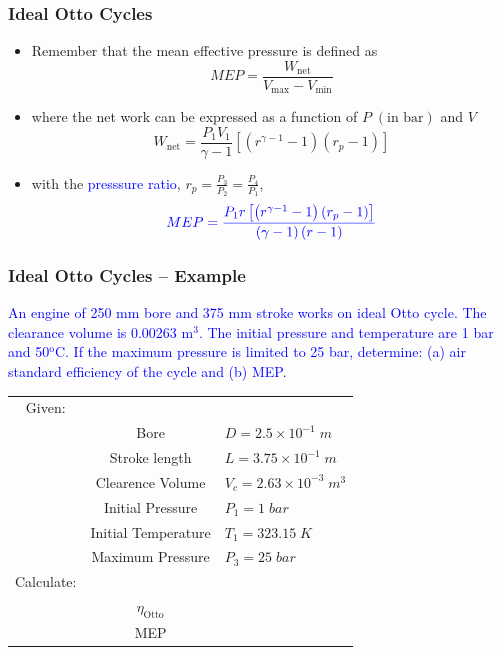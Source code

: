 \documentclass[10pt,compress]{beamer}
\begin{document}
\begin{frame}
 \frametitle{Ideal Otto Cycles}
 \begin{itemize}
  \item <1-> Remember that the mean effective pressure is defined as
   \begin{displaymath}
    MEP = \displaystyle\frac{W_{\text{net}}}{V_{\text{max}}-V_{\text{min}}}
   \end{displaymath}
  \item<2-> where the net work can be expressed as a function of $P\;\left(\text{in bar}\right)$ and $V$
   \begin{displaymath}
     W_{\text{net}} = \displaystyle\frac{P_{1}V_{1}}{\gamma - 1}\left[\left(r^{\gamma-1}-1\right)\left(r_{p}-1\right)\right]
   \end{displaymath}
  \item<3-> with the \textcolor{blue}{presssure ratio}, $r_{p}=\displaystyle\frac{P_{3}}{P_{2}}=\displaystyle\frac{P_{4}}{P_{1}}$,
   \begin{displaymath}
    \textcolor{blue}{MEP = \displaystyle\frac{P_{1}r\left[\left(r^{\gamma-1} - 1\right)\left(r_{p}-1\right)\right]} {\left(\gamma-1\right)\left(r-1\right)}}
   \end{displaymath}
   
 \end{itemize}
\end{frame}


\begin{frame}
 \frametitle{Ideal Otto Cycles -- Example}
\textcolor{blue}{An engine of 250 mm bore and 375 mm stroke works on ideal Otto cycle. The clearance volume is 0.00263 m$^{3}$. The initial pressure and temperature are 1 bar and 50$^{\text{o}}$C. If the maximum pressure is limited to 25 bar, determine: (a) air standard efficiency of the cycle and (b) MEP.}

\medskip

\begin{tabular}{c c l}
Given:    &                  &            \\
          & Bore             & $D = 2.5\times 10^{-1}\;m$  \\
          & Stroke length    & $L = 3.75\times 10^{-1}\;m$ \\
          & Clearence Volume & $V_{c} = 2.63\times 10^{-3}\;m^{3}$ \\
          & Initial Pressure & $P_{1}= 1\;bar$   \\
          & Initial Temperature & $T_{1}=323.15\;K$ \\
          & Maximum Pressure & $P_{3}=25\;bar$\\
Calculate:&                  & \\
          & $\eta_{\text{Otto}}$ & \\
          & MEP              & \\
\end{tabular}

\end{frame}
\end{document}

